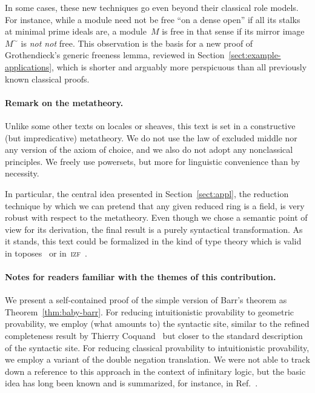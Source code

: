 \documentclass{ws-rv9x6}
\renewcommand{\_}{\mathpunct{.}}
\newcommand{\?}{\,{:}\,}
\newcommand{\notnot}{\emph{not not}\xspace}
\begin{document}
In some cases, these new techniques go even beyond their classical role models.
For instance, while a module need not be free ``on a dense open'' if all its
stalks at minimal prime ideals are, a module~$M$ is free in that sense if its
mirror image~$M^\sim$ is \notnot free. This observation is the basis for a
new proof of Grothendieck's generic freeness lemma, reviewed in
Section~\ref{sect:example-applications}, which is shorter and arguably more
perspicuous than all previously known classical proofs.


\paragraph{Remark on the metatheory.}
Unlike some other texts on locales or sheaves, this text is set in a
constructive (but impredicative) metatheory. We do not use the law of excluded
middle nor any version of the axiom of choice, and we also do not adopt any
nonclassical principles. We freely use powersets, but more for linguistic
convenience than by necessity.

In particular, the central idea presented in
Section~\ref{sect:appl}, the reduction technique by which we can pretend that any
given reduced ring is a field, is very robust with respect to the metatheory.
Even though we chose a semantic point of view for its derivation, the final
result is a purely syntactical transformation. As it stands, this text could be
formalized in the kind of type theory which is valid in
toposes~\cite{maietti:modular-correspondence} or in~\textsc{izf}~\cite{crosilla:cst-izf}.


\paragraph{Notes for readers familiar with the themes of this contribution.}
We present a self-contained proof of the simple
version of Barr's theorem as Theorem~\ref{thm:baby-barr}. For reducing
intuitionistic provability to geometric provability, we employ (what amounts
to) the syntactic site, similar to the refined completeness result
by Thierry Coquand~\cite{coquand:site} but closer to the standard description
of the syntactic site. For reducing classical provability to intuitionistic
provability, we employ a variant of the double negation translation. We were
not able to track down a reference to this approach in the context of
infinitary logic, but the basic idea has long been known and is summarized, for
instance, in Ref.~.
\end{document}
